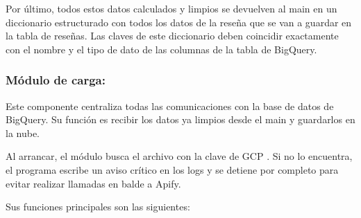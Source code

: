 Por último, todos estos datos calculados y limpios se devuelven al main en un diccionario estructurado con todos los datos de la reseña que se van a guardar en la tabla de reseñas. Las claves de este diccionario deben
coincidir exactamente con el nombre y el tipo de dato de las columnas de la
tabla de BigQuery.

\subsubsection{Módulo de carga: }
Este componente centraliza todas las comunicaciones con la base de datos de BigQuery. Su función es recibir los datos ya limpios desde el main y guardarlos en la nube.

Al arrancar, el módulo busca el archivo con la clave de GCP . Si no lo encuentra, el programa escribe un aviso crítico en los logs y se detiene por completo para evitar realizar llamadas en balde a Apify.

Sus funciones principales son las siguientes:

